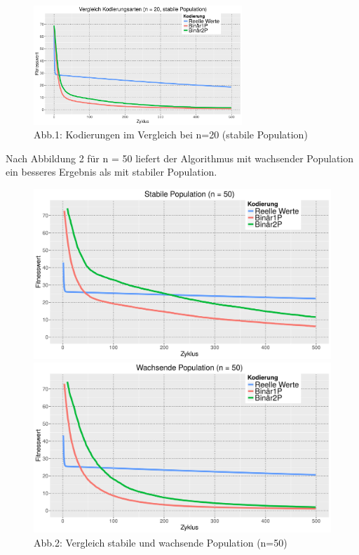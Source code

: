 \documentclass[12pt,
    a4paper,
    headinclude,
    footinclude]{scrreprt}
\begin{document}
\begin{figure}[H]
	\centering
	\includegraphics[width=0.7\textwidth]{../abb1_n20_stable.jpeg} 
	
	\caption*{Abb.1: Kodierungen im Vergleich bei n=20 (stabile Population)} 
	\label{InputOutput}
\end{figure}

Nach Abbildung 2 für n = 50 liefert der Algorithmus mit wachsender Population ein besseres Ergebnis als mit stabiler Population.

\begin{figure}[H]
	\centering
	\begin{minipage}[b]{0.45\textwidth}
		\includegraphics[width=\textwidth]{../abb2_stable.jpeg}
	\end{minipage}
	\hfill
	\begin{minipage}[b]{0.45\textwidth}
		\includegraphics[width=\textwidth]{../abb2_growing.jpeg}
	\end{minipage}
	\caption*{Abb.2: Vergleich stabile und wachsende Population (n=50)} 
\end{figure}
\end{document}
